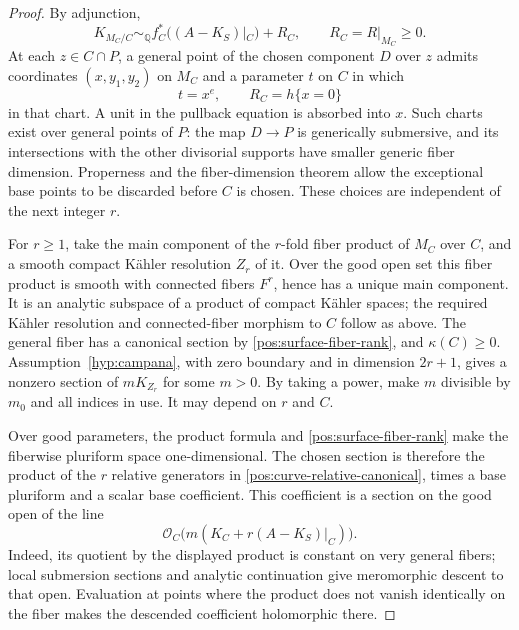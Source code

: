 \documentclass[11pt,letterpaper]{article}
\newcommand{\Q}{\mathbb{Q}}
\newcommand{\OO}{\mathcal{O}}
\theoremstyle{definition}
\theoremstyle{remark}
\begin{document}
\begin{proof}
By adjunction,
\begin{equation}\label{pos:curve-relative-canonical}
 K_{M_C/C}\sim_{\Q} f_C^*((A-K_S)|_C)+R_C,
 \qquad R_C=R|_{M_C}\geq0.
\end{equation}
At each \(z\in C\cap P\), a general point of the chosen component
\(D\) over \(z\) admits coordinates \((x,y_1,y_2)\) on \(M_C\)
and a parameter \(t\) on \(C\) in which
\begin{equation}\label{pos:surface-local-chart}
 t=x^e,\qquad R_C=h\{x=0\}
\end{equation}
in that chart. A unit in the pullback equation is absorbed into \(x\).
Such charts exist over general points of \(P\): the map \(D\to P\)
is generically submersive, and its intersections with the other
divisorial supports have smaller generic fiber dimension. Properness
and the fiber-dimension theorem allow the exceptional base points to
be discarded before \(C\) is chosen. These choices are independent of
the next integer \(r\).

For \(r\geq1\), take the main component of the \(r\)-fold fiber
product of \(M_C\) over \(C\), and a smooth compact Kähler resolution
\(Z_r\) of it. Over the good open set this fiber product is smooth
with connected fibers \(F^r\), hence has a unique main component.
It is an analytic subspace of a product of compact Kähler spaces;
the required Kähler resolution and connected-fiber morphism to \(C\)
follow as above. The general fiber has a canonical section by
\eqref{pos:surface-fiber-rank}, and \(\kappa(C)\geq0\).
Assumption~\ref{hyp:campana}, with zero boundary and in dimension
\(2r+1\), gives a nonzero section of \(mK_{Z_r}\) for some \(m>0\).
By taking a power, make \(m\) divisible by \(m_0\) and all indices
in use. It may depend on \(r\) and \(C\).

Over good parameters, the product formula and
\eqref{pos:surface-fiber-rank} make the fiberwise pluriform space
one-dimensional. The chosen section is therefore the product of the
\(r\) relative generators in
\eqref{pos:curve-relative-canonical}, times a base pluriform and a
scalar base coefficient. This coefficient is a section on the good
open of the line
\begin{equation}\label{pos:fiber-power-coefficient-line}
 \OO_C\bigl(m(K_C+r(A-K_S)|_C)\bigr).
\end{equation}
Indeed, its quotient by the displayed product is constant on very
general fibers; local submersion sections and analytic continuation
give meromorphic descent to that open. Evaluation at points where the
product does not vanish identically on the fiber makes the descended
coefficient holomorphic there.


\end{proof}
\end{document}

